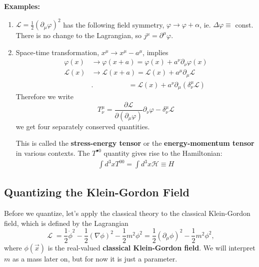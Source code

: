 \documentclass{report}
\theoremstyle{plain}
\theoremstyle{definition}
\theoremstyle{remark}
\newcommand{\FR}[2]{\frac{#1}{#2}}
\newcommand{\mc}{\mathcal}
\newcommand{\vphi}{\varphi}
\newcommand{\di}{\partial}
\newcommand{\ddi}[2]{\FR{\partial {#1}}{\partial {#2}}}
\DeclareMathOperator{\cL}{\mathcal{L}}
\begin{document}
\textbf{Examples:}
\begin{enumerate}
    \item $\mc L = \FR{1}{2}(\di_\mu \vphi)^2$ has the following field
        symmetry, $\vphi \to \vphi+\alpha$, ie. $\Delta\vphi \equiv$ const.
        There is no change to the Lagrangian, so $j^\mu = \di^\mu \vphi$.
    \item Space-time transformation, $x^\mu \to x^\mu-a^\mu$, implies
        \begin{align*}
        \vphi(x) &\to \vphi(x+a) = \vphi(x) + a^\nu\di_\nu\vphi(x)\\
        \mc L(x) &\to \mc L(x+a) = \mc L(x) + a^\mu\di_\mu \mc L\\
                 &. \quad\qquad\qquad = \mc L(x) +
                 a^\nu\di_\mu(\delta^\mu_\nu \mc L)
        \end{align*}
        Therefore we write 
        \[T^\mu_\nu = \ddi{\mc L}{(\di_\mu\vphi)}\di_\nu\vphi -
        \delta^\mu_\nu\mc L\]
        we get four separately conserved quantities.

        This is called the {\bf stress-energy tensor} or the {\bf
          energy-momentum tensor} in various contexts. The $T^{\bullet
          0}$ quantity gives rise to the Hamiltonian:
        \begin{align*}
            \int d^3x T^{00} = \int d^3x \mc H \equiv H
        \end{align*}

\end{enumerate}


\subsection{Quantizing the Klein-Gordon Field}

Before we quantize, let's apply the classical theory to the classical
Klein-Gordon field, which is defined by the Lagrangian
$$ \cL = \frac{1}{2} \dot\phi^2 - \frac{1}{2} (\nabla \phi)^2 -
\frac{1}{2} m^2 \phi^2 = \frac{1}{2} (\partial_\mu \phi)^2 -
\frac{1}{2} m^2 \phi^2, $$ where $\phi(\vec{x})$ is the real-valued
     {\bf classical Klein-Gordon field}. We will interpret $m$ as a
     mass later on, but for now it is just a parameter.
\end{document}
